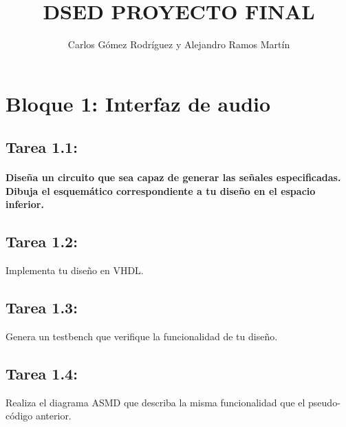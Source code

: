 \documentclass{article}
\title{DSED PROYECTO FINAL}
\author{Carlos Gómez Rodríguez y Alejandro Ramos Martín}
\begin{document}
\maketitle

\tableofcontents

\newpage

\section{Bloque 1: Interfaz de audio}

\subsection{Tarea 1.1:}
\paragraph{Diseña un circuito que sea capaz de generar las señales especificadas. Dibuja el esquemático correspondiente a tu diseño en el espacio inferior.}

\subsection{Tarea 1.2:}
Implementa tu diseño en VHDL.

\subsection{Tarea 1.3:}
Genera un testbench que verifique la funcionalidad de tu diseño.
\newpage
\subsection{Tarea 1.4:}
Realiza el diagrama ASMD que describa la misma funcionalidad que el pseudo-código anterior.
\end{document}
